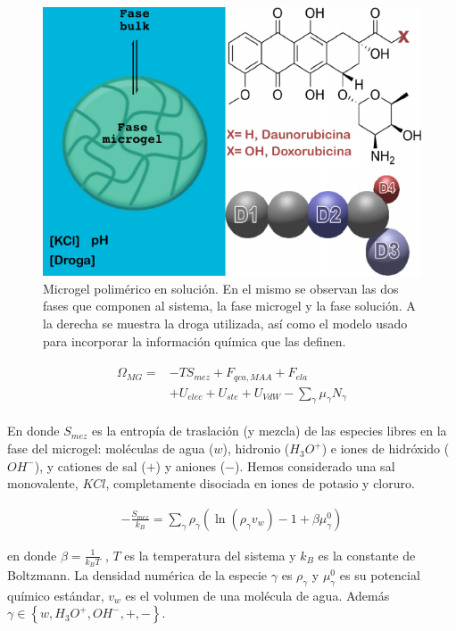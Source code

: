 \begin{figure}[!ht]
	\centering
	\includegraphics[width=0.65\linewidth]{Figures/graph-gel/gel_model.pdf}
	\caption{Microgel polim\'erico en soluci\'on. En el mismo se observan las dos fases que componen al sistema, la fase microgel y la fase soluci\'on. A la derecha se muestra la droga utilizada, as\'i como el modelo usado para incorporar la informaci\'on qu\'imica que las definen.}
	\label{fig:gel:model_gel}
\end{figure}




%
\begin{align}
    \begin{aligned}
       \Omega_{MG}=& -TS_{mez} + F_{qca,MAA} +  F_{ela}\\
       & + U_{elec}+  U_{ste} + U_{VdW} -{\sum_{\gamma}
        {\mu_\gamma N_\gamma}}
    \end{aligned}
    \label{eq:gel:free-energy-implicit}
\end{align}
%

\noindent En donde $S_{mez}$ es la entrop\'ia de traslaci\'on (y mezcla) de las especies libres en la fase del microgel: mol\'eculas de agua ($w$), hidronio ($H_3O^+$) e iones de hidr\'oxido ($OH^-$), y cationes de sal ($+$) y aniones ($-$).
Hemos considerado una sal monovalente, $KCl$,  completamente disociada en iones de potasio y cloruro.

\begin{align}
-\frac{S_{mez}}{k_B}	= \sum_{\gamma} \rho_\gamma\left(\ln\left(\rho_\gamma v_w\right) -1 + \beta\mu^0_\gamma\right) 
\end{align}

\noindent en donde  $\beta=\frac{1}{k_BT}$ , $T$ es la temperatura del sistema  y  $k_B$ es la constante de Boltzmann. La densidad num\'erica de la especie $\gamma$ es $\rho_\gamma$ y $\mu^0_\gamma$ es su potencial qu\'imico est\'andar,  $v_w$ es el volumen de una mol\'ecula de agua. Adem\'as $\gamma \in \left\{ w, H_3O^+, OH^-, +,- \right\}$.

